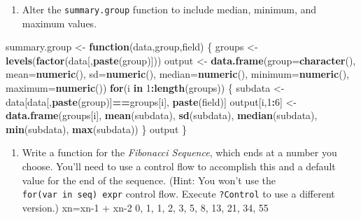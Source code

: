 \documentclass[
]{book}
\newenvironment{Shaded}{\begin{snugshade}}{\end{snugshade}}
\newcommand{\ControlFlowTok}[1]{\textcolor[rgb]{0.13,0.29,0.53}{\textbf{#1}}}
\newcommand{\DataTypeTok}[1]{\textcolor[rgb]{0.13,0.29,0.53}{#1}}
\newcommand{\DecValTok}[1]{\textcolor[rgb]{0.00,0.00,0.81}{#1}}
\newcommand{\KeywordTok}[1]{\textcolor[rgb]{0.13,0.29,0.53}{\textbf{#1}}}
\newcommand{\NormalTok}[1]{#1}
\newcommand{\OperatorTok}[1]{\textcolor[rgb]{0.81,0.36,0.00}{\textbf{#1}}}
\newcommand{\StringTok}[1]{\textcolor[rgb]{0.31,0.60,0.02}{#1}}
\providecommand{\tightlist}{%
  \setlength{\itemsep}{0pt}\setlength{\parskip}{0pt}}
\begin{document}
\begin{center}
\begin{enumerate}
\def\labelenumi{\arabic{enumi}.}
\setcounter{enumi}{1}
\tightlist
\item
  Alter the \texttt{summary.group} function to include median, minimum, and maximum values.
\end{enumerate}

\begin{Shaded}
\begin{Highlighting}[]
\NormalTok{  summary.group <-}\StringTok{ }\ControlFlowTok{function}\NormalTok{(data,group,field) \{}
\NormalTok{    groups <-}\StringTok{ }\KeywordTok{levels}\NormalTok{(}\KeywordTok{factor}\NormalTok{(data[,}\KeywordTok{paste}\NormalTok{(group)]))}
\NormalTok{    output <-}\StringTok{ }\KeywordTok{data.frame}\NormalTok{(}\DataTypeTok{group=}\KeywordTok{character}\NormalTok{(),}
                         \DataTypeTok{mean=}\KeywordTok{numeric}\NormalTok{(),}
                         \DataTypeTok{sd=}\KeywordTok{numeric}\NormalTok{(),}
                         \DataTypeTok{median=}\KeywordTok{numeric}\NormalTok{(),}
                         \DataTypeTok{minimum=}\KeywordTok{numeric}\NormalTok{(),}
                         \DataTypeTok{maximum=}\KeywordTok{numeric}\NormalTok{())}
    \ControlFlowTok{for}\NormalTok{(i }\ControlFlowTok{in} \DecValTok{1}\OperatorTok{:}\KeywordTok{length}\NormalTok{(groups)) \{}
\NormalTok{      subdata <-}\StringTok{ }\NormalTok{data[data[,}\KeywordTok{paste}\NormalTok{(group)]}\OperatorTok{==}\NormalTok{groups[i],}
                      \KeywordTok{paste}\NormalTok{(field)]}
\NormalTok{      output[i,}\DecValTok{1}\OperatorTok{:}\DecValTok{6}\NormalTok{] <-}\StringTok{ }\KeywordTok{data.frame}\NormalTok{(groups[i],}
                                  \KeywordTok{mean}\NormalTok{(subdata),}
                                  \KeywordTok{sd}\NormalTok{(subdata),}
                                  \KeywordTok{median}\NormalTok{(subdata),}
                                  \KeywordTok{min}\NormalTok{(subdata),}
                                  \KeywordTok{max}\NormalTok{(subdata))}
\NormalTok{      \}}
\NormalTok{    output}
\NormalTok{  \}}
\end{Highlighting}
\end{Shaded}

\begin{enumerate}
\def\labelenumi{\arabic{enumi}.}
\setcounter{enumi}{2}
\tightlist
\item
  Write a function for the \emph{Fibonacci Sequence}, which ends at a number you choose. You'll need to use a control flow to accomplish this and a default value for the end of the sequence. (Hint: You won't use the \texttt{for(var\ in\ seq)\ expr} control flow. Execute \texttt{?Control} to use a different version.)
  xn=xn-1 + xn-2
  0, 1, 1, 2, 3, 5, 8, 13, 21, 34, 55
\end{enumerate}


\end{center}
\end{document}
